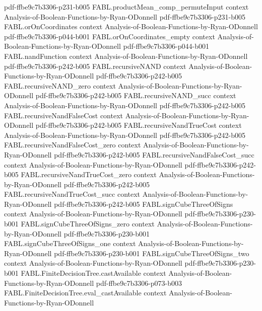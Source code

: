 \begin{theorem}
  {pdf-ffbe9c7b3306-p231-b005}
\proofstep
  {FABL.productMean_comp_permuteInput}
  {context}
  {Analysis-of-Boolean-Functions-by-Ryan-ODonnell}
  {pdf-ffbe9c7b3306-p231-b005}
\proofstep
  {FABL.orOnCoordinates}
  {context}
  {Analysis-of-Boolean-Functions-by-Ryan-ODonnell}
  {pdf-ffbe9c7b3306-p044-b001}
\proofstep
  {FABL.orOnCoordinates_empty}
  {context}
  {Analysis-of-Boolean-Functions-by-Ryan-ODonnell}
  {pdf-ffbe9c7b3306-p044-b001}
\proofstep
  {FABL.nandFunction}
  {context}
  {Analysis-of-Boolean-Functions-by-Ryan-ODonnell}
  {pdf-ffbe9c7b3306-p242-b005}
\proofstep
  {FABL.recursiveNAND}
  {context}
  {Analysis-of-Boolean-Functions-by-Ryan-ODonnell}
  {pdf-ffbe9c7b3306-p242-b005}
\proofstep
  {FABL.recursiveNAND_zero}
  {context}
  {Analysis-of-Boolean-Functions-by-Ryan-ODonnell}
  {pdf-ffbe9c7b3306-p242-b005}
\proofstep
  {FABL.recursiveNAND_succ}
  {context}
  {Analysis-of-Boolean-Functions-by-Ryan-ODonnell}
  {pdf-ffbe9c7b3306-p242-b005}
\proofstep
  {FABL.recursiveNandFalseCost}
  {context}
  {Analysis-of-Boolean-Functions-by-Ryan-ODonnell}
  {pdf-ffbe9c7b3306-p242-b005}
\proofstep
  {FABL.recursiveNandTrueCost}
  {context}
  {Analysis-of-Boolean-Functions-by-Ryan-ODonnell}
  {pdf-ffbe9c7b3306-p242-b005}
\proofstep
  {FABL.recursiveNandFalseCost_zero}
  {context}
  {Analysis-of-Boolean-Functions-by-Ryan-ODonnell}
  {pdf-ffbe9c7b3306-p242-b005}
\proofstep
  {FABL.recursiveNandFalseCost_succ}
  {context}
  {Analysis-of-Boolean-Functions-by-Ryan-ODonnell}
  {pdf-ffbe9c7b3306-p242-b005}
\proofstep
  {FABL.recursiveNandTrueCost_zero}
  {context}
  {Analysis-of-Boolean-Functions-by-Ryan-ODonnell}
  {pdf-ffbe9c7b3306-p242-b005}
\proofstep
  {FABL.recursiveNandTrueCost_succ}
  {context}
  {Analysis-of-Boolean-Functions-by-Ryan-ODonnell}
  {pdf-ffbe9c7b3306-p242-b005}
\proofstep
  {FABL.signCubeThreeOfSigns}
  {context}
  {Analysis-of-Boolean-Functions-by-Ryan-ODonnell}
  {pdf-ffbe9c7b3306-p230-b001}
\proofstep
  {FABL.signCubeThreeOfSigns_zero}
  {context}
  {Analysis-of-Boolean-Functions-by-Ryan-ODonnell}
  {pdf-ffbe9c7b3306-p230-b001}
\proofstep
  {FABL.signCubeThreeOfSigns_one}
  {context}
  {Analysis-of-Boolean-Functions-by-Ryan-ODonnell}
  {pdf-ffbe9c7b3306-p230-b001}
\proofstep
  {FABL.signCubeThreeOfSigns_two}
  {context}
  {Analysis-of-Boolean-Functions-by-Ryan-ODonnell}
  {pdf-ffbe9c7b3306-p230-b001}
\proofstep
  {FABL.FiniteDecisionTree.castAvailable}
  {context}
  {Analysis-of-Boolean-Functions-by-Ryan-ODonnell}
  {pdf-ffbe9c7b3306-p073-b003}
\proofstep
  {FABL.FiniteDecisionTree.eval_castAvailable}
  {context}
  {Analysis-of-Boolean-Functions-by-Ryan-ODonnell}

\end{theorem}
